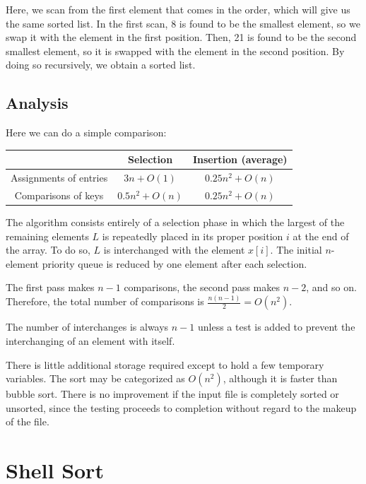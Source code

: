 Here, we scan from the first element that comes in the order, which will give us the same sorted list. In the first scan, 8 is found to be the smallest element, so we swap it with the element in the first position. Then, 21 is found to be the second smallest element, so it is swapped with the element in the second position. By doing so recursively, we obtain a sorted list.

\subsection{Analysis}
Here we can do a simple comparison: 

\begin{table}[H]
  \centering
  \begin{tabular}{c|c|c}
      \toprule
       & Selection & Insertion (average)  \\
    \midrule
      Assignments of entries & \(3n + O(1)\) & \(0.25n^2 + O(n)\)  \\
      Comparisons of keys & \(0.5n^2 + O(n)\) & \(0.25n^2 + O(n)\)  \\
      \bottomrule
  \end{tabular}
\end{table}

The algorithm consists entirely of a selection phase in which the largest of the remaining elements \(L\) is repeatedly placed in its proper position \(i\) at the end of the array. To do so, \(L\) is interchanged with the element \(x[i]\). The initial \(n\)-element priority queue is reduced by one element after each selection.

The first pass makes \(n - 1\) comparisons, the second pass makes \(n - 2\), and so on. Therefore, the total number of comparisons is \(\frac{n(n - 1)}{2} = O(n^2)\).

The number of interchanges is always \(n - 1\) unless a test is added to prevent the interchanging of an element with itself.

There is little additional storage required except to hold a few temporary variables. The sort may be categorized as \(O(n^2)\), although it is faster than bubble sort. There is no improvement if the input file is completely sorted or unsorted, since the testing proceeds to completion without regard to the makeup of the file.

\section{Shell Sort}
